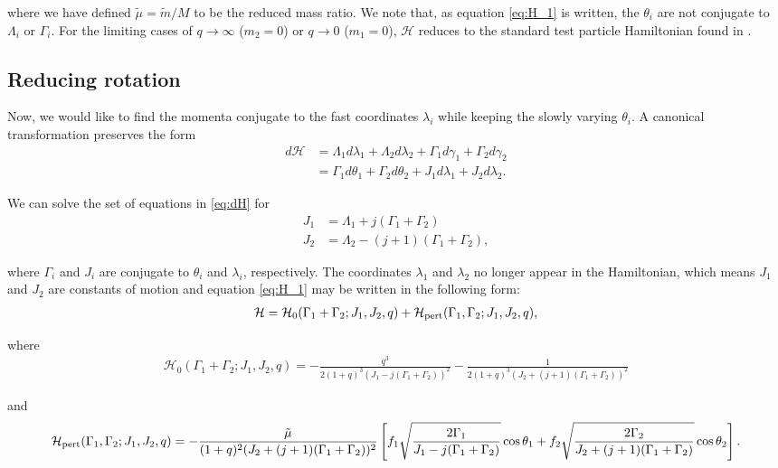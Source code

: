 \documentclass[usenatbib]{mnras}
\begin{document}
\noindent where we have defined \(\tilde\mu=\tilde m/M\) to be
the reduced mass ratio.  We note that, as equation \eqref{eq:H_1} is
written, the \(\theta_i\) are not conjugate to \(\Lambda_i\) or
\(\Gamma_i\).  For the limiting cases of \(q\to \infty\) (\(m_2=0\)) or
\(q\to 0\) (\(m_1=0\)), \(\mathcal{H}\) reduces to the standard test
particle Hamiltonian found in \citet{murray_solar_2000}.
\subsection{Reducing rotation}
\label{sec:org6932680}
Now, we would like to find the momenta conjugate to the fast
coordinates \(\lambda_i\) while keeping the slowly varying \(\theta_i\).
A canonical transformation preserves the form
\begin{align}
  \label{eq:dH} 
  d\mathcal{H}
  &= \Lambda_1 d\lambda_1+\Lambda_2d\lambda_2
    + \Gamma_1d\gamma_1+\Gamma_2d\gamma_2\nonumber\\
  &= \Gamma_1 d\theta_1 + \Gamma_2 d\theta_2
    +J_1 d\lambda_1+J_2d\lambda_2 .
\end{align}

\noindent
We can solve the set of equations in \eqref{eq:dH} for
\begin{align}
\label{eq:J1}
J_1 &= \Lambda_1 + j(\Gamma_1+\Gamma_2)\\
\label{eq:J2}
J_2 &= \Lambda_2 - (j+1)(\Gamma_1+\Gamma_2),
\end{align}

\noindent where \(\Gamma_i\) and \(J_i\) are conjugate to
\(\theta_i\) and \(\lambda_i\), respectively.
The coordinates \(\lambda_1\) and \(\lambda_2\)
no longer appear in the Hamiltonian,
which means \(J_1\) and \(J_2\) are constants of motion and
equation \eqref{eq:H_1} may be written
in the following form:
\begin{align}
\label{eq:H_2}
  \mathcal{H}
  = \mathcal{H}_0(\Gamma_1+\Gamma_2; J_1, J_2, q)
                  + \mathcal{H}_{\rm pert}(\Gamma_1,\Gamma_2; J_1, J_2, q),
\end{align}

\noindent
where
\begin{align}
  \label{eq:H01}
  \mathcal{H}_0(\Gamma_1+\Gamma_2; J_1, J_2, q)
  = -\frac{q^3}{2(1+q)^3(J_1-j(\Gamma_1+\Gamma_2))^2}
  -\frac{1}{2(1+q)^3(J_2+(j+1)(\Gamma_1+\Gamma_2))^2} 
\end{align}

\noindent
and
\begin{align}
  \label{eq:Hpert1}
  \mathcal{H}_{\rm pert}(\Gamma_1,\Gamma_2; J_1, J_2, q)
  = -\frac{\tilde\mu}{(1+q)^2(J_2+(j+1)(\Gamma_1+\Gamma_2))^2}
  \left[
    f_1\sqrt{\frac{2\Gamma_1}{J_1 - j(\Gamma_1+\Gamma_2)}}\cos\theta_1
  +f_2\sqrt{\frac{2\Gamma_2}{J_2 + (j+1)(\Gamma_1+\Gamma_2)}}\cos\theta_2
    \right].
\end{align}
\end{document}
